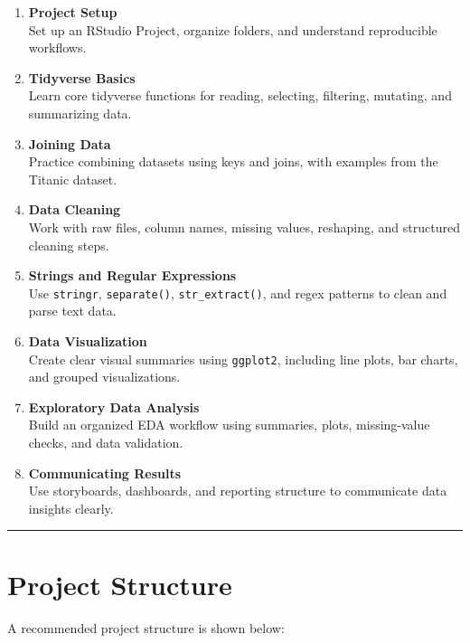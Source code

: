 \documentclass[
  11pt,
  oneside]{book}
\begin{document}
\begin{enumerate}
\def\labelenumi{\arabic{enumi}.}
\item
  \textbf{Project Setup}\\
  Set up an RStudio Project, organize folders, and understand reproducible workflows.
\item
  \textbf{Tidyverse Basics}\\
  Learn core tidyverse functions for reading, selecting, filtering, mutating, and summarizing data.
\item
  \textbf{Joining Data}\\
  Practice combining datasets using keys and joins, with examples from the Titanic dataset.
\item
  \textbf{Data Cleaning}\\
  Work with raw files, column names, missing values, reshaping, and structured cleaning steps.
\item
  \textbf{Strings and Regular Expressions}\\
  Use \texttt{stringr}, \texttt{separate()}, \texttt{str\_extract()}, and regex patterns to clean and parse text data.
\item
  \textbf{Data Visualization}\\
  Create clear visual summaries using \texttt{ggplot2}, including line plots, bar charts, and grouped visualizations.
\item
  \textbf{Exploratory Data Analysis}\\
  Build an organized EDA workflow using summaries, plots, missing-value checks, and data validation.
\item
  \textbf{Communicating Results}\\
  Use storyboards, dashboards, and reporting structure to communicate data insights clearly.
\end{enumerate}

\begin{center}\rule{0.5\linewidth}{0.5pt}\end{center}

\chapter*{Project Structure}\label{project-structure}

A recommended project structure is shown below:
\end{document}
